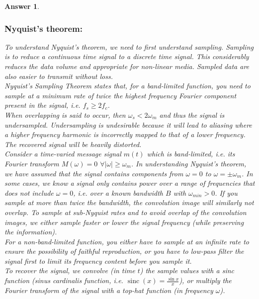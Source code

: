 \documentclass[a4paper]{article}
\DeclareMathOperator{\sinc}{sinc}
\newtheorem{ans}{Answer}[subsection]
\theoremstyle{new}
\begin{document}
\begin{ans}
\subsubsection*{Nyquist's theorem:}
To understand Nyquist's theorem, we need to first understand sampling. Sampling is to reduce a continuous time signal to a discrete time signal. This considerably reduces the data volume and appropriate for non-linear media. Sampled data are also easier to transmit without loss.\\[5pt]
Nyquist's Sampling Theorem states that, for a band-limited function, you need to sample at a minimum rate of twice the highest frequency Fourier component present in the signal, i.e. $f_s\geq 2f_c$.\\[5pt]
When overlapping is said to occur, then $\omega_s<2\omega_m$ and thus the signal is undersampled. Undersampling is undesirable because it will lead to aliasing where a higher frequency harmonic is incorrectly mapped to that of a lower frequency. The recovered signal will be heavily distorted.\\[5pt]
Consider a time-varied message signal $m(t)$ which is band-limited, i.e. its Fourier transform $M(\omega)=0$ $\forall|\omega|\geq\omega_m$. In understanding Nyquist's theorem, we have assumed that the signal contains components from $\omega=0$ to $\omega=\pm\omega_m$. In some cases, we know a signal only contains power over a range of frequencies that does not include $\omega=0$, i.e. over a known bandwidth $B$ with $\omega_{min}>0$. If you sample at more than twice the bandwidth, the convolution image will similarly not overlap. To sample at sub-Nyquist rates and to avoid overlap of the convolution images, we either sample faster or lower the signal frequency (while preserving the information).\\[5pt]
For a non-band-limited function, you either have to sample at an infinite rate to ensure the possibility of faithful reproduction, or you have to low-pass filter the signal first to limit its frequency content before you sample it.\\[5pt]
To recover the signal, we convolve (in time $t$) the sample values with a sinc function (sinus cardinalis function, i.e. $\sinc(x)=\frac{\sin x}{x}$), or multiply the Fourier transform of the signal with a top-hat function (in frequency $\omega$).

\end{ans}
\end{document}
